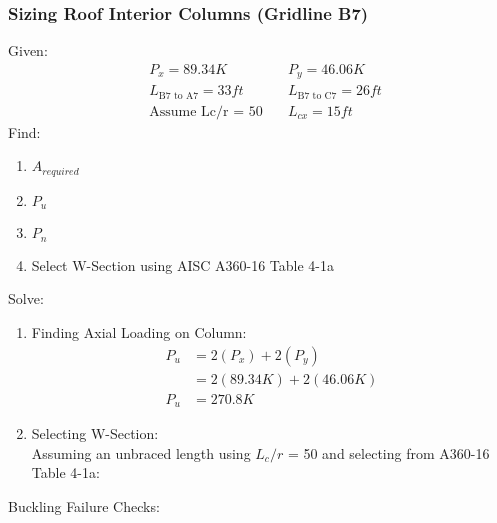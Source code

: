 \documentclass{report} %
\begin{document}
\subsubsection*{Sizing Roof Interior Columns (Gridline B7)}
Given:
\begin{equation*}
    \begin{aligned}
        &P_x = 89.34K \quad &P_y = 46.06K \\
        &L_{\text{B7 to A7}} = 33ft \quad &L_{\text{B7 to C7}} = 26ft \\
        &\text{Assume Lc/r = 50} \quad &L_{cx} = 15ft
    \end{aligned}
\end{equation*}
Find:
\begin{enumerate}
    \item $A_{required}$
    \item $P_u$
    \item $P_n$
    \item Select W-Section using AISC A360-16 Table 4-1a
\end{enumerate}
Solve:
\begin{enumerate}
    \item Finding Axial Loading on Column:
        \begin{equation*}
            \begin{aligned}
                P_u &= 2(P_x) + 2(P_y) \\
                    &= 2(89.34K) + 2(46.06K) \\
                P_u &= 270.8K  
            \end{aligned}
        \end{equation*}
    \item Selecting W-Section:\\
        Assuming an unbraced length using $L_c/r$ = 50 and selecting from A360-16 Table 4-1a:
            \begin{center}
            \end{center}    
\end{enumerate}
Buckling Failure Checks:
\end{document}
